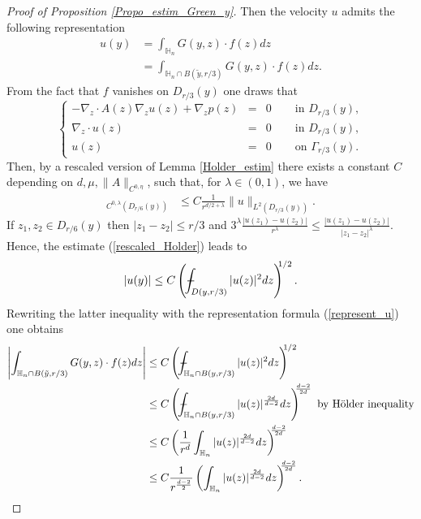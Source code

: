 \documentclass[11pt, reqno]{amsart}
\theoremstyle{definition}
\theoremstyle{remark}
\numberwithin{equation}{section}
\def\Xint#1{\mathchoice
	{\XXint\displaystyle\textstyle{#1}}%
	{\XXint\textstyle\scriptstyle{#1}}%
	{\XXint\scriptstyle\scriptscriptstyle{#1}}%
	{\XXint\scriptscriptstyle\scriptscriptstyle{#1}}%
	\!\int}
\def\XXint#1#2#3{{\setbox0=\hbox{$#1{#2#3}{\int}$ }
		\vcenter{\hbox{$#2#3$ }}\kern-.6\wd0}}
\def\dashint{\Xint-}        %
\begin{document}
\begin{appendices}
\begin{proof}[Proof of \textup{Proposition \ref{Propo_estim_Green_y}}]
	\noindent Then  the velocity $u$ admits the following representation 
		\begin{align}
			u(y)&=  \int_{\mathbb{H}_n}  G(y,z)\cdot f(z) dz\\
			&=  \int_{\mathbb{H}_n\cap B(\tilde{y},r/3)}  G(y,z)\cdot f(z) dz.\label{u_equal_int Gfdz}
		\end{align}
		From the fact that $f$ vanishes on $D_{r/3}(y)$ one draws that 
		\begin{equation}
			\left\{
			\begin{array}{rcll}
				-\nabla_{\!z}\cdot A(z) \nabla_{\!z} u(z)  +  \nabla_{\!z}p(z)&=& 0 \;  \quad& \mbox{in } D_{r/3}(y),\\
				\nabla_{\!z}\cdot u(z)&=& 0 \;  \quad & \mbox{in } D_{r/3}(y),\\
				u(z)&=& 0\quad & \mbox{on }  \Gamma_{r/3}(y).
			\end{array}
			\right. 
		\end{equation}
		Then, by a rescaled version of Lemma \ref{Holder_estim}   there exists a constant $C$ depending on $d, \mu, \|A\|_{C^{0,\eta}}$, such that, for $\lambda\in(0,1)$, we have
		\begin{align}
			[u]_{C^{0,\lambda}(D_{r/6}(y))} &\leq C \frac{1}{r^{d/2+\lambda}}  \| u\|_{L^2(D_{r/3}(y))}.   \label{rescaled_Holder}
		\end{align}
		If $z_1,z_2\in  D_{r/6}(y)$ then $|z_1-z_2|\leq r/3$ and $3^\lambda\frac{|u(z_1)-u(z_2) |}{r^\lambda} \leq \frac{|u(z_1)-u(z_2) |}{|z_1-z_2|^\lambda}$. Hence, the estimate (\ref{rescaled_Holder})  leads to
		\begin{align*}
			|u(y)|\leq C	\left(\dashint_{D(y,r/3)} |u(z)|^2 dz\right)^{\!\!\!1/2}.
		\end{align*}
		Rewriting the latter inequality with the representation formula (\ref{represent_u})
		one obtains
		\begin{align*}
			\left| \int_{\mathbb{H}_n\cap B(\tilde{y},r/3)} G(y ,z)\cdot f(z) dz \right|&\leq  C	\left(\dashint_{\mathbb{H}_n\cap B(y,r/3)} |u(z)|^2 dz\right)^{\!\!\!1/2}\\
			&\leq  C	\left(\dashint_{\mathbb{H}_n\cap B(y,r/3)} |u(z)|^{\frac{2d}{d-2}} dz\right)^{\!\!\!\frac{d-2}{2d}} \mbox{ by H\"older inequality}\\
			&\leq  C	\left(\frac{1}{r^d}\int_{\mathbb{H}_n} |u(z)|^{\frac{2d}{d-2}} dz\right)^{\!\!\!\frac{d-2}{2d}}\\
			&\leq  C	\frac{1}{r^\frac{d-2}{2}}	\left(\int_{\mathbb{H}_n} |u(z)|^{\frac{2d}{d-2}} dz\right)^{\!\!\!\frac{d-2}{2d}}.

\end{align*}
\end{proof}
\end{appendices}
\end{document}
